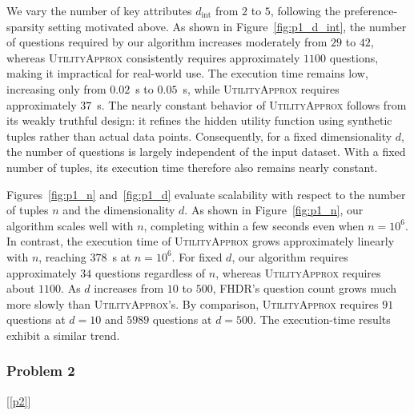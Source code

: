 We vary the number of key attributes $d_\text{int}$ from $2$ to $5$, following the preference-sparsity setting motivated above. As shown in Figure~\ref{fig:p1_d_int}, the number of questions required by our algorithm increases moderately from $29$ to $42$, whereas \textsc{UtilityApprox} consistently requires approximately $1100$ questions, making it impractical for real-world use. The execution time remains low, increasing only from $0.02$~s to $0.05$~s, while \textsc{UtilityApprox} requires approximately $37$~s. The nearly constant behavior of \textsc{UtilityApprox} follows from its weakly truthful design: it refines the hidden utility function using synthetic tuples rather than actual data points. Consequently, for a fixed dimensionality $d$, the number of questions is largely independent of the input dataset. With a fixed number of tuples, its execution time therefore also remains nearly constant.

Figures~\ref{fig:p1_n} and~\ref{fig:p1_d} evaluate scalability with respect to the number of tuples $n$ and the dimensionality $d$. As shown in Figure~\ref{fig:p1_n}, our algorithm scales well with $n$, completing within a few seconds even when $n=10^6$. In contrast, the execution time of \textsc{UtilityApprox} grows approximately linearly with $n$, reaching $378$~s at $n=10^6$. For fixed $d$, our algorithm requires approximately $34$ questions regardless of $n$, whereas \textsc{UtilityApprox} requires about $1100$. As $d$ increases from $10$ to $500$, FHDR's question count grows much more slowly than \textsc{UtilityApprox}'s. By comparison, \textsc{UtilityApprox} requires $91$ questions at $d=10$ and $5989$ questions at $d=500$. The execution-time results exhibit a similar trend.

\subsubsection{Problem 2}[\ref{p2}]

